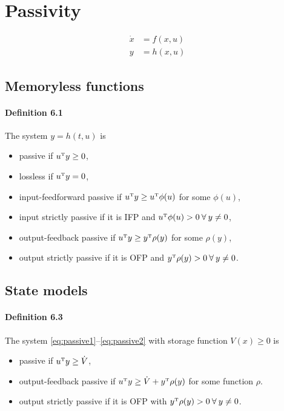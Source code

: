 \section{Passivity}
\begin{align}
	\dot{x} &= f(x,u) \label{eq:passive1} \\
	y       &= h(x,u) \label{eq:passive2}
\end{align}

\subsection{Memoryless functions}
\paragraph{Definition 6.1}
The system $y = h(t,u)$ is
\begin{itemize}
	\item passive if $u^{\scriptscriptstyle \mathrm{T}} y \geq 0$,
	\item lossless if $u^{\scriptscriptstyle \mathrm{T}} y = 0$,
	\item input-feedforward passive if $u^{\scriptscriptstyle \mathrm{T}} y \geq u^{\scriptscriptstyle \mathrm{T}} \phi(u)$ for some $\phi(u)$,
	\item input strictly passive if it is IFP and $u^{\scriptscriptstyle \mathrm{T}} \phi(u) > 0 \: \forall \: y \neq 0$,
	\item output-feedback passive if $u^{\scriptscriptstyle \mathrm{T}} y \geq y^{\scriptscriptstyle \mathrm{T}} \rho(y)$ for some $\rho(y)$,
	\item output strictly passive if it is OFP and $y^{\scriptscriptstyle \mathrm{T}} \rho(y) > 0 \: \forall \: y \neq 0$.
\end{itemize}

\subsection{State models}
\paragraph{Definition 6.3}
The system \eqref{eq:passive1}--\eqref{eq:passive2} with storage function $V(x) \geq 0$ is
\begin{itemize}
	\item passive if $u^{\scriptscriptstyle \mathrm{T}} y \geq \dot{V}$,
	\item output-feedback passive if $u^{\scriptscriptstyle \mathrm{T}} y \geq \dot{V} + y^{\scriptscriptstyle \mathrm{T}} \rho(y)$ for some function $\rho$.
	\item output strictly passive if it is OFP with $y^{\scriptscriptstyle \mathrm{T}} \rho(y) > 0 \: \forall \: y \neq 0$.
\end{itemize}

